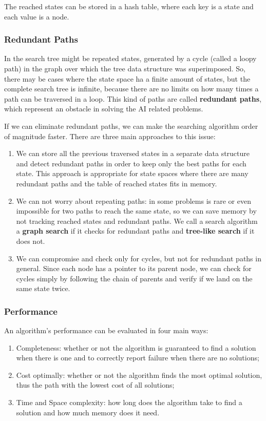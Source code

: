 \documentclass{article}
\begin{document}
The reached states can be stored in a hash table, where each key is a state and each value is a node.

\subsubsection{Redundant Paths}
In the search tree might be repeated states, generated by a cycle (called a loopy path) in the graph over which the tree data structure was superimposed. So, there may be cases where the state space ha a finite amount of states, but the complete search tree is infinite, because there are no limits on how many times a path can be traversed in a loop. This kind of paths are called \textbf{redundant paths}, which represent an obstacle in solving the AI related problems. 

If we can eliminate redundant paths, we can make the searching algorithm order of magnitude faster. There are three main approaches to this issue:
\begin{enumerate}
    \item We can store all the previous traversed states in a separate data structure and detect redundant paths in order to keep only the best paths for each state. This approach is appropriate for state spaces where there are many redundant paths and the table of reached states fits in memory.
    \item We can not worry about repeating paths: in some problems is rare or even impossible for two paths to reach the same state, so we can save memory by not tracking reached states and redundant paths. We call a search algorithm a \textbf{graph search} if it checks for redundant paths and \textbf{tree-like search} if it does not.
    \item We can compromise and check only for cycles, but not for redundant paths in general. Since each node has a pointer to its parent node, we can check for cycles simply by following the chain of parents and verify if we land on the same state twice.
\end{enumerate}

\subsubsection{Performance}
An algorithm's performance can be evaluated in four main ways:
\begin{enumerate}
    \item Completeness: whether or not the algorithm is guaranteed to find a solution when there is one and to correctly report failure when there are no solutions;
    \item Cost optimally: whether or not the algorithm finds the most optimal solution, thus the path with the lowest cost of all solutions;
    \item Time and Space complexity: how long does the algorithm take to find a solution and how much memory does it need.
\end{enumerate}
\end{document}
